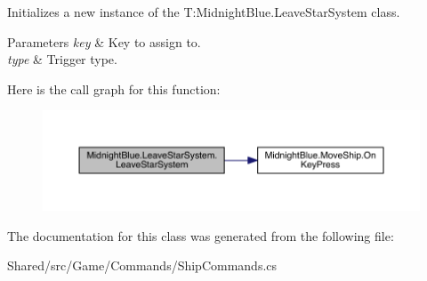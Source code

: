 Initializes a new instance of the T\+:\+Midnight\+Blue.\+Leave\+Star\+System class. 


\begin{DoxyParams}{Parameters}
{\em key} & Key to assign to.\\
\hline
{\em type} & Trigger type.\\
\hline
\end{DoxyParams}
Here is the call graph for this function\+:\nopagebreak
\begin{figure}[H]
\begin{center}
\leavevmode
\includegraphics[width=350pt]{class_midnight_blue_1_1_leave_star_system_a6793d6a941afd58a9e9030d8aec1fe83_cgraph}
\end{center}
\end{figure}


The documentation for this class was generated from the following file\+:\begin{DoxyCompactItemize}
\item 
Shared/src/\+Game/\+Commands/Ship\+Commands.\+cs\end{DoxyCompactItemize}

